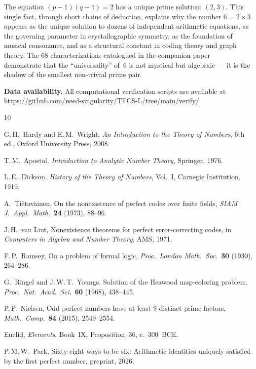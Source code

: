\documentclass{amsart}
\begin{document}
The equation $(p-1)(q-1) = 2$ has a unique prime solution: $(2, 3)$. This single fact, through short chains of deduction, explains why the number $6 = 2 \times 3$ appears as the unique solution to dozens of independent arithmetic equations, as the governing parameter in crystallographic symmetry, as the foundation of musical consonance, and as a structural constant in coding theory and graph theory. The 68 characterizations catalogued in the companion paper~\cite{68ways} demonstrate that the ``universality'' of~6 is not mystical but algebraic --- it is the shadow of the smallest non-trivial prime pair.

\bigskip
\noindent\textbf{Data availability.} All computational verification scripts are available at \url{https://github.com/need-singularity/TECS-L/tree/main/verify/}.

\begin{thebibliography}{10}

G.\,H.~Hardy and E.\,M.~Wright, \emph{An Introduction to the Theory of Numbers}, 6th ed., Oxford University Press, 2008.

T.\,M.~Apostol, \emph{Introduction to Analytic Number Theory}, Springer, 1976.

L.\,E.~Dickson, \emph{History of the Theory of Numbers}, Vol.~I, Carnegie Institution, 1919.

A.~Ti\"etav\"ainen, On the nonexistence of perfect codes over finite fields, \emph{SIAM J.\ Appl.\ Math.}\ \textbf{24} (1973), 88--96.

J.\,H.~van Lint, Nonexistence theorems for perfect error-correcting codes, in \emph{Computers in Algebra and Number Theory}, AMS, 1971.

F.\,P.~Ramsey, On a problem of formal logic, \emph{Proc.\ London Math.\ Soc.}\ \textbf{30} (1930), 264--286.

G.~Ringel and J.\,W.\,T.~Youngs, Solution of the Heawood map-coloring problem, \emph{Proc.\ Nat.\ Acad.\ Sci.}\ \textbf{60} (1968), 438--445.

P.\,P.~Nielsen, Odd perfect numbers have at least 9 distinct prime factors, \emph{Math.\ Comp.}\ \textbf{84} (2015), 2549--2554.

Euclid, \emph{Elements}, Book~IX, Proposition~36, c.~300~BCE.

P.\,M.\,W.~Park, Sixty-eight ways to be six: Arithmetic identities uniquely satisfied by the first perfect number, preprint, 2026.

\end{thebibliography}
\end{document}

